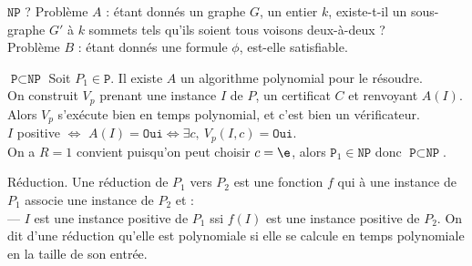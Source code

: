 \documentclass[french, 11pt]{article}
\renewcommand*{\P}{\texttt{P}}
\newcommand*{\NP}{\texttt{NP}}
\begin{document}
\begin{ex}{$\NP$ ?}{}
    Problème $A$ : étant donnés un graphe $G$, un entier $k$, existe-t-il un sous-graphe $G'$ à $k$ sommets tels qu'ils soient tous voisons deux-à-deux ?\\
    Problème $B$ : étant donnés une formule $\phi$, est-elle satisfiable.
\end{ex}

\vspace*{-0.6cm}

\begin{thm}{$\P\subset\NP$}{}
    Soit $P_1\in \P$. Il existe $A$ un algorithme polynomial pour le résoudre.\\
    On construit $V_p$ prenant une instance $I$ de $P$, un certificat $C$ et renvoyant $A(I)$.\\
    Alors $V_p$ s'exécute bien en temps polynomial, et c'est bien un vérificateur.\\
    $I$ positive $\iff$ $A(I)=\texttt{Oui}\iff\exists c, ~ V_p(I,c)=\texttt{Oui}$.\\
    On a $R=1$ convient puisqu'on peut choisir $c=\e$, alors $\P_1\in\NP$ donc $\P\subset\NP$.
\end{thm}

\vspace*{-0.6cm}

\begin{defi}{Réduction.}{}
    Une réduction de $P_1$ vers $P_2$ est une fonction $f$ qui à une instance de $P_1$ associe une instance de $P_2$ et :\\
    --- $I$ est une instance positive de $P_1$ ssi $f(I)$ est une instance positive de $P_2$.\n
    On dit d'une réduction qu'elle est polynomiale si elle se calcule en temps polynomiale en la taille de son entrée.
\end{defi}

\vspace*{-0.6cm}
\end{document}
